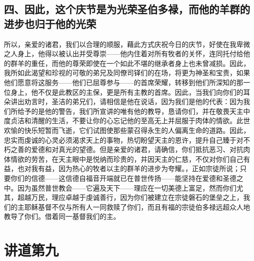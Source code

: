 
\subsection{四、因此，这个庆节是为光荣圣伯多禄，而他的羊群的进步也归于他的光荣}

所以，亲爱的诸君，我们以合理的顺服，藉此方式庆祝今日的庆节，好使在我卑微之人身上，他得以被认出并受尊崇——他内住着对所有牧者的关怀，连同托付给他的群羊的重任，而他的尊荣即使在一个如此不堪的继承者身上也未曾减损。因此，我所如此渴望和珍视的可敬的弟兄及同僚司铎们的在场，将更为神圣和宝贵，如果他们愿意将这服务——他们已屈尊参与——的首席荣耀，转移到他们所深知的那一位身上，他不仅是此教区的主保，更是所有主教的首席。因此，当我们向你们的耳朵讲出劝言时，圣洁的弟兄们，请相信是他在说话，因为我们是他的代表：因为我们所给予的是他的警告，我们所宣讲的唯有他的教导，恳请你们，并在敬畏天主中度贞洁和清醒的生活，不要让你的心忘记他的至高无上并屈服于肉体的情欲。此世欢愉的快乐短暂而飞逝，它们试图使那些蒙召得永生的人偏离生命的道路。因此，忠实而虔诚的心灵必须渴求天上的事物，热切盼望天主的恩许，提升自己臻于对不朽之善的爱德和对真光的望德。但是亲爱的诸君，请确信，你们抵抗恶习、对抗肉体情欲的劳苦，在天主眼中是悦纳而珍贵的，并因天主的仁慈，不仅对你们自己有益，也对我有益，因为热心的牧者以主的群羊的进步为夸耀。，正如宗徒所说；只要你们的信德——这信德自福音开端就已在普世传扬——能坚持在爱德和圣德之中。因为虽然普世教会——它遍及天下——理应在一切美德上富足，然而你们尤其，超越万民，理应卓越于虔诚善行，因为你们被建立在宗徒磐石的堡垒之上，我们的主耶稣基督不仅与所有人一同救赎了你们，而且有福的宗徒伯多禄远超众人地教导了你们。借着同一基督我们的主。\par



\section{讲道第九}

\par

